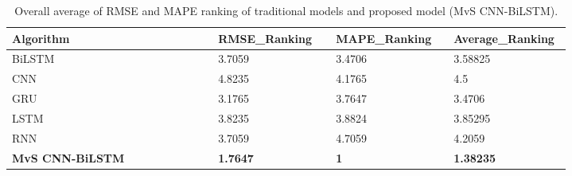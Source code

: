 



  \begin{table}[H]
    \setlength{\tabcolsep}{3pt}
    {\renewcommand{\arraystretch}{1}%
    \begin{longtable}[c]{ p{0.35\linewidth} p{0.20\linewidth} p{0.20\linewidth} p{0.20\linewidth}  }
      \caption{Overall average of RMSE and MAPE ranking of traditional models and proposed model (MvS CNN-BiLSTM).}
      \label{AVG RANK}
    \\ \hline
    Algorithm&RMSE\_Ranking&MAPE\_Ranking&Average\_Ranking
    \\ \hline
    \endhead
    BiLSTM&3.7059&3.4706&3.58825\\
    CNN&4.8235&4.1765&4.5\\
    GRU&3.1765&3.7647&3.4706\\
    LSTM&3.8235&3.8824&3.85295\\
    RNN&3.7059&4.7059&4.2059\\
    \textbf{MvS CNN-BiLSTM}&\textbf{1.7647}&\textbf{1}&\textbf{1.38235} \\\hline
    \end{longtable}}
    \end{table}








